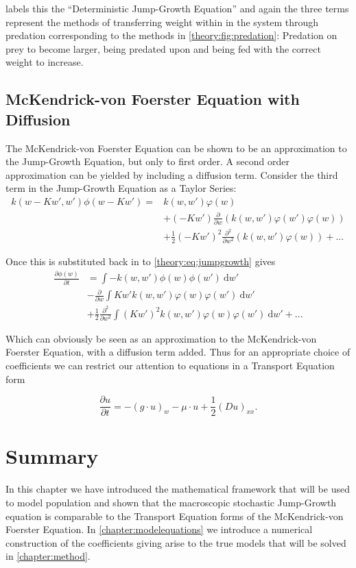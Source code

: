 \documentclass[../main]{subfiles}
\begin{document}
  \cite{datta2010} labels this the ``Deterministic Jump-Growth Equation'' and again the three terms represent the methods of transferring weight within in the system through predation corresponding to the methods in \autoref{theory:fig:predation}: Predation on prey to become larger, being predated upon and being fed with the correct weight to increase.

  \subsection{McKendrick-von Foerster Equation with Diffusion}\label{theory:sec:mvfdiffusion}
  The McKendrick-von Foerster Equation can be shown to be an approximation to the Jump-Growth Equation, but only to first order. A second order approximation can be yielded by including a diffusion term. Consider the third term in the Jump-Growth Equation as a Taylor Series:
  \begin{align}
    k(w - Kw', w')\phi(w - K w')
    = & k(w, w') \varphi(w) \nonumber \\
      & + (-K w') \frac{\partial}{\partial w} \left(k(w, w')\varphi(w')\varphi(w)\right) \nonumber \\
      & + \frac{1}{2}(-K w')^2 \frac{\partial^2}{\partial w^2} \left(k(w, w')\varphi(w)\right) + ...
  \end{align}

  Once this is substituted back in to \autoref{theory:eq:jumpgrowth} gives
  \begin{align}\label{theory:eq:jumpgrowth}
    \frac{\partial \phi(w)}{\partial t}
    & = \int - k(w, w') \phi(w)\phi(w')  \: \mathrm{d}w' \nonumber \\
    & - \frac{\partial}{\partial w} \int K w' k(w, w')\varphi(w)\varphi(w') \: \mathrm{d}w' \nonumber \\
    & + \frac{1}{2}\frac{\partial^2}{\partial w^2} \int (K w')^2 k(w, w')\varphi(w)\varphi(w') \: \mathrm{d}w' + ...
  \end{align}

  Which can obviously be seen as an approximation to the McKendrick-von Foerster Equation, with a diffusion term added. Thus for an appropriate choice of coefficients we can restrict our attention to equations in a Transport Equation form

  \begin{equation}
    \frac{\partial u}{\partial t} = - (g \cdot u)_w - \mu \cdot u + \frac{1}{2}(D u)_{xx}.
  \end{equation}

  \section{Summary}
  In this chapter we have introduced the mathematical framework that will be used to model population and shown that the macroscopic stochastic Jump-Growth equation is comparable to the Transport Equation forms of the McKendrick-von Foerster Equation. In \autoref{chapter:modelequations} we introduce a numerical construction of the coefficients giving arise to the true models that will be solved in \autoref{chapter:method}. 
\end{document}
